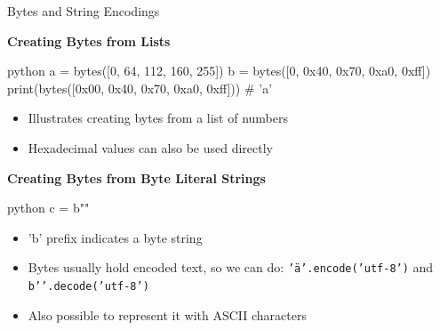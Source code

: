 \documentclass[
	11pt, 
]{beamer}
\begin{document}
\begin{frame}[fragile]{Bytes and String Encodings}

\textbf{Creating Bytes from Lists}

\begin{mintedbox}{python}
a = bytes([0, 64, 112, 160, 255])
b = bytes([0, 0x40, 0x70, 0xa0, 0xff])
print(bytes([0x00, 0x40, 0x70, 0xa0, 0xff])) # 'a'
\end{mintedbox}

\begin{itemize}
    \item Illustrates creating bytes from a list of numbers
    \item Hexadecimal values can also be used directly
\end{itemize}

\textbf{Creating Bytes from Byte Literal Strings}

\begin{mintedbox}{python}
c = b"\xff"
\end{mintedbox}

\begin{itemize}
    \item 'b' prefix indicates a byte string
    \item Bytes usually hold encoded text, so we can do: \texttt{'ä'.encode('utf-8')} and \texttt{b''.decode('utf-8')}
    \item Also possible to represent it with ASCII characters
\end{itemize}



\end{frame}

\end{document}
